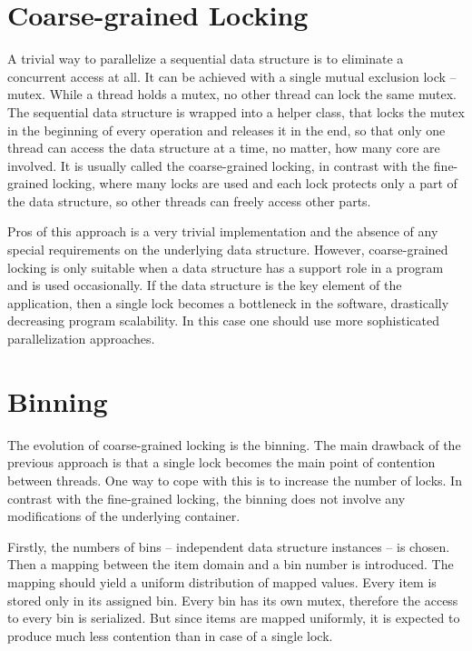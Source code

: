 \section{Coarse-grained Locking}

A trivial way to parallelize a sequential data structure is to eliminate a concurrent access at all. It can be achieved with a single mutual exclusion lock – mutex. While a thread holds a mutex, no other thread can lock the same mutex. The sequential data structure is wrapped into a helper class, that locks the mutex in the beginning of every operation and releases it in the end, so that only one thread can access the data structure at a time, no matter, how many core are involved. It is usually called the coarse-grained locking, in contrast with the fine-grained locking, where many locks are used and each lock protects only a part of the data structure, so other threads can freely access other parts.

Pros of this approach is a very trivial implementation and the absence of any special requirements on the underlying data structure. However, coarse-grained locking is only suitable when a data structure has a support role in a program and is used occasionally. If the data structure is the key element of the application, then a single lock becomes a bottleneck in the software, drastically decreasing program scalability. In this case one should use more sophisticated parallelization approaches.

\section{Binning}

The evolution of coarse-grained locking is the binning. The main drawback of the previous approach is that a single lock becomes the main point of contention between threads. One way to cope with this is to increase the number of locks. In contrast with the fine-grained locking, the binning does not involve any modifications of the underlying container.

Firstly, the numbers of bins – independent data structure instances – is chosen. Then a mapping between the item domain and a bin number is introduced. The mapping should yield a uniform distribution of mapped values. Every item is stored only in its assigned bin. Every bin has its own mutex, therefore the access to every bin is serialized. But since items are mapped uniformly, it is expected to produce much less contention than in case of a single lock.

